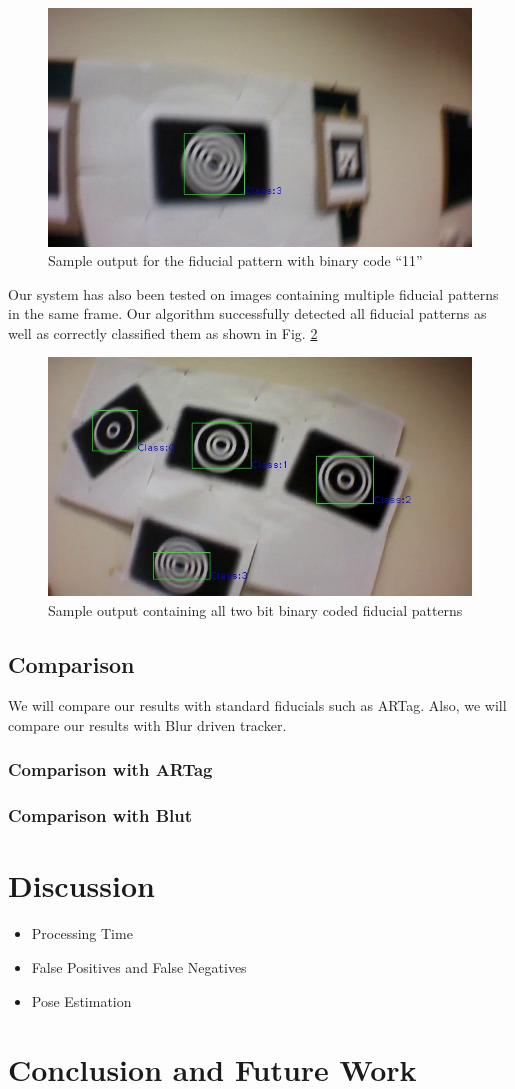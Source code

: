 \documentclass[runningheads]{llncs}
\begin{document}
\begin{figure}
\centering
  \includegraphics[width=.8\linewidth]{output_11.jpg}
  \caption{Sample output for the fiducial pattern with binary code ``11''}
  \label{fig:output3}
\end{figure}

Our system has also been tested on images containing multiple fiducial patterns
in the same frame. Our algorithm successfully detected all fiducial patterns as
well as correctly classified them as shown in Fig. \ref{fig:output_all}
\begin{figure}
\centering
  \includegraphics[width=.8\linewidth]{output_all_2.jpg}
  \caption{Sample output containing all two bit binary coded fiducial patterns}
  \label{fig:output_all}
\end{figure}

\subsection{Comparison}
We will compare our results with standard fiducials such as ARTag. Also, we will
compare our results with Blur driven tracker.
\subsubsection{Comparison with ARTag}
\subsubsection{Comparison with Blut} 

\section{Discussion}
\begin{itemize}
\item Processing Time
\item False Positives and False Negatives
\item Pose Estimation
\end{itemize}
\section{Conclusion and Future Work}



\end{document}
